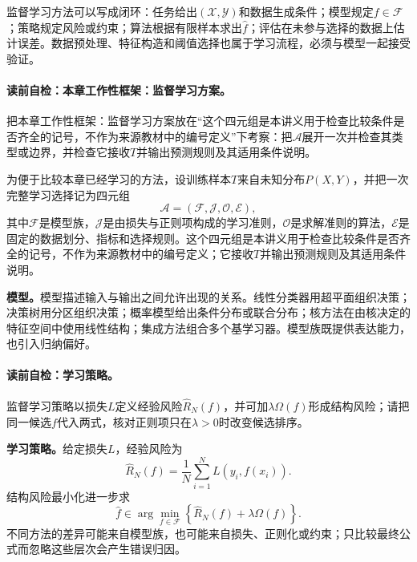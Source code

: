 监督学习方法可以写成闭环：任务给出$(\mathcal X,\mathcal Y)$和数据生成条件；模型规定$f\in\mathcal F$；策略规定风险或约束；算法根据有限样本求出$\widehat f$；评估在未参与选择的数据上估计误差。数据预处理、特征构造和阈值选择也属于学习流程，必须与模型一起接受验证。

\label{struct:V3-C07-CH07}
\label{def:V3-C07-learning-procedure}
\paragraph{读前自检：本章工作性框架：监督学习方案。}把本章工作性框架：监督学习方案放在“这个四元组是本讲义用于检查比较条件是否齐全的记号，不作为来源教材中的编号定义”下考察：把$\mathscr A$展开一次并检查其类型或边界，并检查它接收$T$并输出预测规则及其适用条件说明。\par

\begin{keypointbox}[title=本章工作性框架：监督学习方案]
为便于比较本章已经学习的方法，设训练样本$T$来自未知分布$P(X,Y)$，并把一次完整学习选择记为四元组
\[
\mathscr A=(\mathcal F,\mathcal J,\mathcal O,\mathcal E),
\]
其中$\mathcal F$是模型族，$\mathcal J$是由损失与正则项构成的学习准则，$\mathcal O$是求解准则的算法，$\mathcal E$是固定的数据划分、指标和选择规则。这个四元组是本讲义用于检查比较条件是否齐全的记号，不作为来源教材中的编号定义；它接收$T$并输出预测规则及其适用条件说明。
\end{keypointbox}

\label{struct:V3-C07-CH08}
\textbf{模型。}模型描述输入与输出之间允许出现的关系。线性分类器用超平面组织决策；决策树用分区组织决策；概率模型给出条件分布或联合分布；核方法在由核决定的特征空间中使用线性结构；集成方法组合多个基学习器。模型族既提供表达能力，也引入归纳偏好。

\paragraph{读前自检：学习策略。}监督学习策略以损失$L$定义经验风险$\widehat R_N(f)$，并可加$\lambda\Omega(f)$形成结构风险；请把同一候选$f$代入两式，核对正则项只在$\lambda>0$时改变候选排序。\par

\label{struct:V3-C07-CH09}
\textbf{学习策略。}给定损失$L$，经验风险为
\[
\widehat R_N(f)=\frac1N\sum_{i=1}^{N}L(y_i,f(x_i)).
\]
结构风险最小化进一步求
\[
\widehat f\in\arg\min_{f\in\mathcal F}
\left\{\widehat R_N(f)+\lambda\Omega(f)\right\}.
\]
不同方法的差异可能来自模型族，也可能来自损失、正则化或约束；只比较最终公式而忽略这些层次会产生错误归因。

